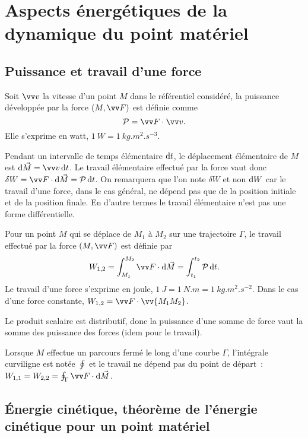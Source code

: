 \chapter{Aspects énergétiques de la dynamique du point matériel}
\label{chap:aspectenergetiques}
\minitoc
\minilof
\minilot

\section{Puissance et travail d'une force}
\label{chap4-sec:puissanceettravail}
\begin{defdef}[Puissance]
  Soit $\vvv$ la vitesse d'un point $M$ dans le référentiel considéré, la puissance développée par la force $(M, \vF)$ est définie comme
  \begin{equation}
    \P=\vF \cdot \vvv.
  \end{equation}
  Elle s'exprime en watt, $\SI{1}{W}=\SI{1}{kg.m^2.s^{-3}}$.
\end{defdef}
 Pendant un intervalle de temps élémentaire $\mathop{}\mathopen{}\mathrm{d} t$, le déplacement élémentaire de $M$ est $\diff \vec{M} = \vvv \diff t$. Le travail élémentaire effectué par la force vaut donc $\delta W = \vF \cdot \diff \vec{M} = \P \diff t$. On remarquera que l'on note $\delta W$ et non $\mathop{}\mathopen{}\mathrm{d} W$ car le travail d'une force, dans le cas général, ne dépend pas que de la position initiale et de la position finale. En d'autre termes le travail élémentaire n'est pas une forme différentielle.
\begin{defdef}[Travail]
  Pour un point $M$ qui se déplace de $M_1$ à $M_2$ sur une trajectoire $\Gamma$, le travail effectué par la force $(M, \vF)$ est définie par
\begin{equation}
  W_{1, 2} = \int_{M_1}^{M_2} \vF \cdot \diff \vec{M} = \int_{t_1}^{t_2} \P \diff t.
\end{equation}
Le travail d'une force s'exprime en joule, $\SI{1}{J}=\SI{1}{N.m}=\SI{1}{kg.m^2.s^{-2}}$. Dans le cas d'une force constante, $W_{1, 2}=\vF \cdot \vv{M_1M_2}$.
\end{defdef}
 Le produit scalaire est distributif, donc la puissance d'une somme de force vaut la somme des puissance des forces (idem pour le travail).

Lorsque $M$ effectue un parcours fermé le long d'une courbe $\Gamma$, l'intégrale curviligne est notée $\oint$ et le travail ne dépend pas du point de départ~: $W_{1,1} = W_{2,2} = \oint_\Gamma \vF \cdot \diff \vec{M}$.

\section{Énergie cinétique, théorème de l'énergie cinétique pour un point matériel}
\label{chap4-sec:ernergiecinetique}

